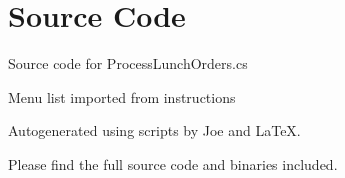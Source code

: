 \documentclass[12pt]{article}
\begin{document}
\maketitle
\pagebreak


\section{Source Code}

Source code for \textsf{ProcessLunchOrders.cs}


Menu list imported from instructions


\newpage



\newpage

Autogenerated using scripts by Joe and \LaTeX.

Please find the full source code and binaries included.
\end{document}
